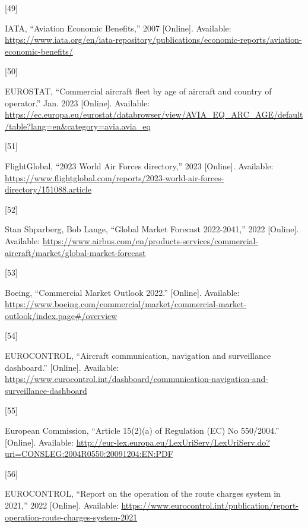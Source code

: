 \documentclass[
  11pt,
  a4paper,
]{book}
\newlength{\cslhangindent}
\newlength{\csllabelwidth}
\newlength{\cslentryspacingunit} %
\newenvironment{CSLReferences}[2] %
 {%
  \setlength{\parindent}{0pt}
  \ifodd #1
  \let\oldpar\par
  \def\par{\hangindent=\cslhangindent\oldpar}
  \fi
  \setlength{\parskip}{#2\cslentryspacingunit}
 }%
 {}
\newcommand{\CSLLeftMargin}[1]{\parbox[t]{\csllabelwidth}{#1}}
\newcommand{\CSLRightInline}[1]{\parbox[t]{\linewidth - \csllabelwidth}{#1}\break}
\begin{document}
\begin{CSLReferences}{0}{0}
\leavevmode{}%
\CSLLeftMargin{{[}49{]} }%
\CSLRightInline{IATA, {``Aviation {Economic Benefits},''} 2007
{[}Online{]}. Available:
\url{https://www.iata.org/en/iata-repository/publications/economic-reports/aviation-economic-benefits/}}

\leavevmode{}%
\CSLLeftMargin{{[}50{]} }%
\CSLRightInline{EUROSTAT, {``Commercial aircraft fleet by age of
aircraft and country of operator.''} Jan. 2023 {[}Online{]}. Available:
\url{https://ec.europa.eu/eurostat/databrowser/view/AVIA_EQ_ARC_AGE/default/table?lang=en\&category=avia.avia_eq}}

\leavevmode{}%
\CSLLeftMargin{{[}51{]} }%
\CSLRightInline{FlightGlobal, {``2023 {World Air Forces} directory,''}
2023 {[}Online{]}. Available:
\url{https://www.flightglobal.com/reports/2023-world-air-forces-directory/151088.article}}

\leavevmode{}%
\CSLLeftMargin{{[}52{]} }%
\CSLRightInline{Stan Shparberg, Bob Lange, {``Global {Market Forecast}
2022-2041,''} 2022 {[}Online{]}. Available:
\url{https://www.airbus.com/en/products-services/commercial-aircraft/market/global-market-forecast}}

\leavevmode{}%
\CSLLeftMargin{{[}53{]} }%
\CSLRightInline{Boeing, {``Commercial {Market Outlook}
2022\textendash 2041.''} {[}Online{]}. Available:
\url{https://www.boeing.com/commercial/market/commercial-market-outlook/index.page\#/overview}}

\leavevmode{}%
\CSLLeftMargin{{[}54{]} }%
\CSLRightInline{EUROCONTROL, {``Aircraft communication, navigation and
surveillance dashboard.''} {[}Online{]}. Available:
\url{https://www.eurocontrol.int/dashboard/communication-navigation-and-surveillance-dashboard}}

\leavevmode{}%
\CSLLeftMargin{{[}55{]} }%
\CSLRightInline{European Commission, {``Article 15(2)(a) of {Regulation}
({EC}) {No} 550/2004.''} {[}Online{]}. Available:
\url{http://eur-lex.europa.eu/LexUriServ/LexUriServ.do?uri=CONSLEG:2004R0550:20091204:EN:PDF}}

\leavevmode{}%
\CSLLeftMargin{{[}56{]} }%
\CSLRightInline{EUROCONTROL, {``Report on the operation of the route
charges system in 2021,''} 2022 {[}Online{]}. Available:
\url{https://www.eurocontrol.int/publication/report-operation-route-charges-system-2021}}


\end{CSLReferences}
\end{document}
